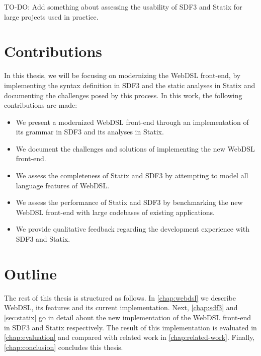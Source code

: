   TO-DO: Add something about assessing the usability of SDF3 and Statix for large projects used in practice.
  
  \section{\label{sec:contributions}Contributions}
    In this thesis, we will be focusing on modernizing the WebDSL front-end, by implementing the syntax definition in SDF3 and the static analyses in Statix and documenting the challenges posed by this process. In this work, the following contributions are made:

    \begin{itemize}
      \item We present a modernized WebDSL front-end through an implementation of its grammar in SDF3 and its analyses in Statix.
      \item We document the challenges and solutions of implementing the new WebDSL front-end.
      \item We assess the completeness of Statix and SDF3 by attempting to model all language features of WebDSL.
      \item We assess the performance of Statix and SDF3 by benchmarking the new WebDSL front-end with large codebases of existing applications.
      \item We provide qualitative feedback regarding the development experience with SDF3 and Statix.
    \end{itemize}

  \section{\label{sec:outline}Outline}
    The rest of this thesis is structured as follows. In \cref{chap:webdsl} we describe WebDSL, its features and its current implementation. Next, \cref{chap:sdf3} and \cref{sec:statix} go in detail about the new implementation of the WebDSL front-end in SDF3 and Statix respectively. The result of this implementation is evaluated in \cref{chap:evaluation} and compared with related work in \cref{chap:related-work}. Finally, \cref{chap:conclusion} concludes this thesis.
